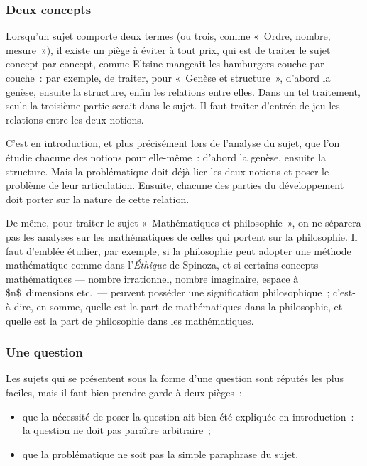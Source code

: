 \documentclass[a4paper]{article}
\begin{document}
\subsubsection{Deux concepts}
\label{sec-2-3-2}


Lorsqu'un sujet comporte deux termes (ou trois, comme « Ordre, nombre,
mesure »), il existe un piège à éviter à tout prix, qui est de traiter le
sujet concept par concept, comme Eltsine mangeait les hamburgers couche
par couche : par exemple, de traiter, pour « Genèse et structure »,
d'abord la genèse, ensuite la structure, enfin les relations entre
elles. Dans un tel traitement, seule la troisième partie serait dans le
sujet. Il faut traiter d'entrée de jeu les relations entre les deux
notions.

C'est en introduction, et plus précisément lors de l'analyse du sujet,
que l'on étudie chacune des notions pour elle-même : d'abord la genèse,
ensuite la structure. Mais la problématique doit déjà lier les deux
notions et poser le problème de leur articulation. Ensuite, chacune des
parties du développement doit porter sur la nature de cette relation.

De même, pour traiter le sujet « Mathématiques et philosophie », on ne
séparera pas les analyses sur les mathématiques de celles qui portent
sur la philosophie. Il faut d'emblée étudier, par exemple, si la
philosophie peut adopter une méthode mathématique comme dans l'\emph{Éthique}
de Spinoza, et si certains concepts mathématiques --- nombre
irrationnel, nombre imaginaire, espace à \$n\$ dimensions etc. --- peuvent
posséder une signification philosophique ; c'est-à-dire, en somme,
quelle est la part de mathématiques dans la philosophie, et quelle est
la part de philosophie dans les mathématiques.
\subsubsection{Une question}
\label{sec-2-3-3}


Les sujets qui se présentent sous la forme d'une question sont réputés
les plus faciles, mais il faut bien prendre garde à deux pièges :

\begin{itemize}
\item que la nécessité de poser la question ait bien été expliquée en
   introduction : la question ne doit pas paraître arbitraire ;
\item que la problématique ne soit pas la simple paraphrase du sujet.
\end{itemize}
\end{document}
